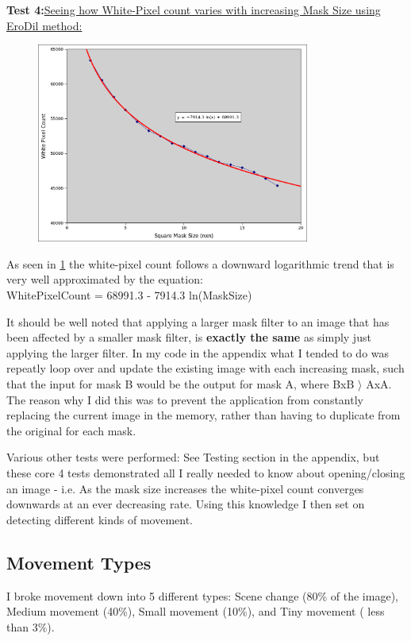 \pagebreak
{\hspace{-20pt} \bf Test 4:}{\underline {Seeing how White-Pixel count varies with increasing Mask Size using EroDil method:}}
\begin{figure}[H]
	\vspace{0pt}
	\begin{center}
		\includegraphics[width=0.8\textwidth]{../images/ImageOps/chartMask}
		\caption{}
		\label{img:maskChart}
	\end{center}
\end{figure}
As seen in \cref{img:maskChart} the white-pixel count follows a downward logarithmic trend that is very well approximated by the equation:\\
WhitePixelCount = 68991.3 - 7914.3 ln(MaskSize)

It should be well noted that applying a larger mask filter to an image that has been affected by a smaller mask filter, is {\bf exactly the same} as simply just applying the larger filter.  In my code in the appendix what I tended to do was repeatly loop over and update the existing image with each increasing mask, such that the input for mask B would be the output for mask A, where BxB \(\rangle\) AxA.  The reason why I did this was to prevent the application from constantly replacing the current image in the memory, rather than having to duplicate from the original for each mask.

Various other tests were performed: See Testing section in the appendix, but these core 4 tests demonstrated all I really needed to know about opening/closing an image - i.e. As the mask size increases the white-pixel count converges downwards at an ever decreasing rate. Using this knowledge I then set on detecting different kinds of movement.

\subsection{Movement Types}
I broke movement down into 5 different types:  Scene change (80\% of the image), Medium movement (40\%), Small movement (10\%), and Tiny movement ( less than 3\%).

